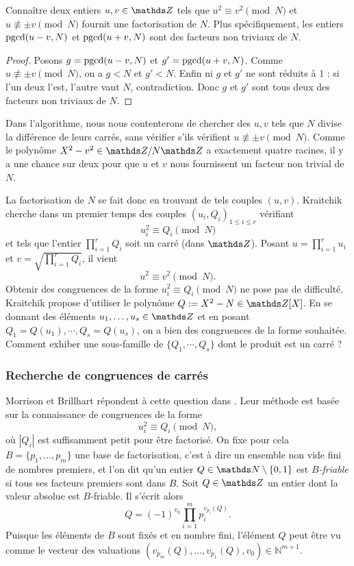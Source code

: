 \begin{lemme}
	Connaître deux entiers $u, v \in \Z$ tels que $u^2 \equiv v^2 
	\pmod{N}$ et $u\not\equiv \pm v\pmod{N}$ fournit une factorisation de $N$.
	Plus spécifiquement, les entiers $\operatorname{pgcd}(u-v, N)$ et $\operatorname{pgcd}(u+v, N)$ sont
	des facteurs non triviaux de $N$.
\end{lemme}

\begin{proof}
	Posons $g =\operatorname{pgcd}(u-v, N)$ et $g' = \operatorname{pgcd}(u+v, N)$. Comme $u\not\equiv \pm
	v\pmod{N}$, on a $g<N$ et $g'<N$. Enfin ni $g$ et $g'$ ne sont réduits à
	$1$ : si l'un deux l'est, l'autre vaut $N$, contradiction. Donc $g$ et $g'$
	sont tous deux des facteurs non triviaux de $N$.
\end{proof}

\begin{remarque}
	Dans l'algorithme, nous nous contenterons de chercher des $u, v$ tels que
	$N$ divise la différence de leurs carrés, sans vérifier s'ils vérifient $u
	\not\equiv \pm v\pmod{N}$. Comme le polynôme $X^2 - v^2 \in \Z/N\Z$ a
    exactement quatre racines, il y a \og{} une chance sur deux \fg{}  pour que
	$u$ et $v$ nous fournissent un facteur non trivial de $N$. \\
\end{remarque}

La factorisation de $N$ se fait donc en trouvant de tels couples $(u, v)$.
Kraitchik cherche dans un premier temps des couples $(u_i, Q_i)_{1\leq i \leq r}$
vérifiant \[u_i^2 \equiv Q_i \pmod{N}\] et tels que l'entier $\prod_{i=1}^r Q_i$ 
soit un carré (dans $\Z$). Posant $u = \prod_{i=1}^r u_i$ et $v = 
\sqrt{\prod_{i=1}^rQ_i}$, il vient \[u^2\equiv v^2 \pmod{N}.\]
Obtenir des congruences de la forme $u_i^2 \equiv Q_i \pmod{N}$ ne pose pas de 
difficulté. Kraitchik propose d'utiliser le polynôme $Q:= X^2 - N \in \Z[X]$.
En se donnant des éléments $u_1,\dots, u_s\in \Z$ et en posant
$Q_1 = Q(u_1), \cdots, Q_s = Q(u_s)$, on a bien des congruences de la forme 
souhaitée. Comment exhiber une sous-famille de $\{Q_1, \cdots, Q_s\}$ dont le
produit est un carré ?

\subsubsection{Recherche de congruences de carrés}

Morrison et Brillhart répondent à cette question dans \cite{MB}. Leur méthode
est basée sur la connaissance de congruences de la forme \[u_i^2 \equiv Q_i
\pmod{N},\] où $| Q_i |$ est suffisamment petit pour être factorisé. On fixe
pour cela $B = \{p_1, \dots, p_m\}$ une base de factorisation, c'est à dire un
ensemble non vide fini de nombres premiers, et l'on dit qu'un entier $Q\in
\N\setminus \{0, 1\}$ est \emph{$B$-friable} si tous ses facteurs premiers sont
dans $B$. Soit $Q\in \Z$ un entier dont la valeur absolue est
$B$-friable. Il s'écrit alors \[Q = (-1)^{v_0}\prod_{i=1}^m p_i^{v_{p_i}(Q)}.\]
Puisque les éléments de $B$ sont fixés et en nombre fini, l'élément $Q$ peut
être vu comme le vecteur des valuations $(v_{p_m}(Q), \dots, v_{p_1}(Q), v_0 )
\in \mathbb{N}^{m+1}$.

